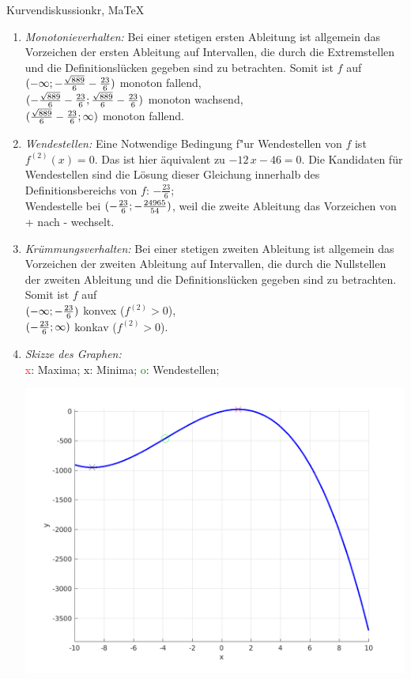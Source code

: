 \begin{MAufgabe}{Kurvendiskussion}{kr, MaTeX}
\begin{enumerate}
 \item \emph{Monotonieverhalten:} 
 Bei einer stetigen ersten Ableitung ist allgemein das Vorzeichen der ersten Ableitung auf Intervallen, die durch die Extremstellen und die Definitionsl\"ucken gegeben sind zu betrachten. Somit ist $f$ auf \\ 
 $(-\infty; - \frac{\sqrt{889}}{6} - \frac{23}{6})$ monoton fallend, \\ 
 $( - \frac{\sqrt{889}}{6} - \frac{23}{6};\frac{\sqrt{889}}{6} - \frac{23}{6})$ monoton  wachsend, \\ 
 $(\frac{\sqrt{889}}{6} - \frac{23}{6}; \infty)$ monoton fallend. \\ 
 \item \emph{Wendestellen:} 
 Eine Notwendige Bedingung f"ur Wendestellen von $f$ ist $f^{(2)}(x)=0$. 
 Das ist hier \"aquivalent zu $ - 12\, x - 46=0$. 
 Die Kandidaten f\"ur Wendestellen sind die L\"osung dieser Gleichung innerhalb des Definitionsbereichs von $f$: $- \frac{23}{6}$; \\ 
 Wendestelle bei $(- \frac{23}{6};- \frac{24965}{54})$, weil die zweite Ableitung das Vorzeichen von + nach - wechselt. \\ 
 \item \emph{Kr\"ummungsverhalten:} 
 Bei einer stetigen zweiten Ableitung ist allgemein das Vorzeichen der zweiten Ableitung auf Intervallen, die durch die Nullstellen der zweiten Ableitung und die Definitionsl\"ucken gegeben sind zu betrachten. 
 Somit ist $f$ auf \\ 
 $(-\infty ;- \frac{23}{6})$  konvex ($f^{(2)}>0$), \\ 
 $(- \frac{23}{6}; \infty)$  konkav ($f^{(2)}>0$). \\ 
 \item \emph{Skizze des Graphen:} \\ 
 {\textcolor{red} x}: Maxima; {\textcolor{black} x}: Minima; {\textcolor{green} o}: Wendestellen; 
  \begin{center}
  \includegraphics[width=0.8\linewidth]{Abb_zur_Ag_autogenerated_fractions_18.png} \end{center}
  
 \end{enumerate}
 \else\relax\fi
  \end{MAufgabe}